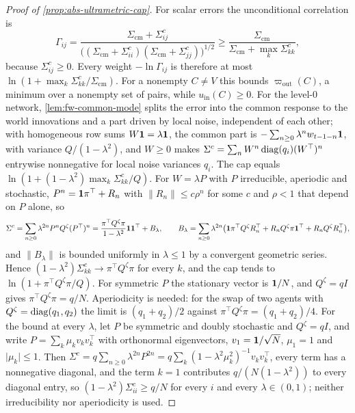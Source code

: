 \begin{proof}[Proof of \cref{prop:abs-ultrametric-cap}]
For scalar errors the unconditional correlation is
\[
\Gamma_{ij}=\frac{\Sigma_{\mathrm{cm}}+\Sigma^c_{ij}}{\bigl((\Sigma_{\mathrm{cm}}+\Sigma^c_{ii})(\Sigma_{\mathrm{cm}}+\Sigma^c_{jj})\bigr)^{1/2}}\ge\frac{\Sigma_{\mathrm{cm}}}{\Sigma_{\mathrm{cm}}+\max_k\Sigma^c_{kk}},
\]
because $\Sigma^c_{ij}\ge0$. Every weight $-\ln\Gamma_{ij}$ is therefore at most $\ln(1+\max_k\Sigma^c_{kk}/\Sigma_{\mathrm{cm}})$. For a nonempty $C\ne V$ this bounds $\varpi_{\mathrm{out}}(C)$, a minimum over a nonempty set of pairs, while $u_{\mathrm{in}}(C)\ge0$. For the level-0 network, \cref{lem:fw-common-mode} splits the error into the common response to the world innovations and a part driven by local noise, independent of each other; with homogeneous row sums $W\mathbf{1}=\lambda\mathbf{1}$, the common part is $-\sum_{n\ge0}\lambda^nw_{t-1-n}\mathbf{1}$, with variance $Q/(1-\lambda^2)$, and $W\ge0$ makes $\Sigma^c=\sum_nW^n\operatorname{diag}(q_i)(W^\top)^n$ entrywise nonnegative for local noise variances $q_i$. The cap equals $\ln(1+(1-\lambda^2)\max_k\Sigma^c_{kk}/Q)$. For $W=\lambda P$ with $P$ irreducible, aperiodic and stochastic, $P^n=\mathbf{1}\pi^\top+R_n$ with $\lVert R_n\rVert\le c\rho^n$ for some $c$ and $\rho<1$ that depend on $P$ alone, so
\[
\Sigma^c=\sum_{n\ge0}\lambda^{2n}P^nQ^\zeta(P^\top)^n=\frac{\pi^\top Q^\zeta\pi}{1-\lambda^2}\mathbf{1}\mathbf{1}^\top+B_\lambda,\qquad B_\lambda=\sum_{n\ge0}\lambda^{2n}\bigl(\mathbf{1}\pi^\top Q^\zeta R_n^\top+R_nQ^\zeta\pi\mathbf{1}^\top+R_nQ^\zeta R_n^\top\bigr),
\]
and $\lVert B_\lambda\rVert$ is bounded uniformly in $\lambda\le1$ by a convergent geometric series. Hence $(1-\lambda^2)\Sigma^c_{kk}\to\pi^\top Q^\zeta\pi$ for every $k$, and the cap tends to $\ln(1+\pi^\top Q^\zeta\pi/Q)$. For symmetric $P$ the stationary vector is $\mathbf{1}/N$, and $Q^\zeta=qI$ gives $\pi^\top Q^\zeta\pi=q/N$. Aperiodicity is needed: for the swap of two agents with $Q^\zeta=\operatorname{diag}(q_1,q_2)$ the limit is $(q_1+q_2)/2$ against $\pi^\top Q^\zeta\pi=(q_1+q_2)/4$. For the bound at every $\lambda$, let $P$ be symmetric and doubly stochastic and $Q^\zeta=qI$, and write $P=\sum_k\mu_kv_kv_k^\top$ with orthonormal eigenvectors, $v_1=\mathbf{1}/\sqrt N$, $\mu_1=1$ and $\lvert\mu_k\rvert\le1$. Then $\Sigma^c=q\sum_{n\ge0}\lambda^{2n}P^{2n}=q\sum_k(1-\lambda^2\mu_k^2)^{-1}v_kv_k^\top$, every term has a nonnegative diagonal, and the term $k=1$ contributes $q/(N(1-\lambda^2))$ to every diagonal entry, so $(1-\lambda^2)\Sigma^c_{ii}\ge q/N$ for every $i$ and every $\lambda\in(0,1)$; neither irreducibility nor aperiodicity is used.
\end{proof}
